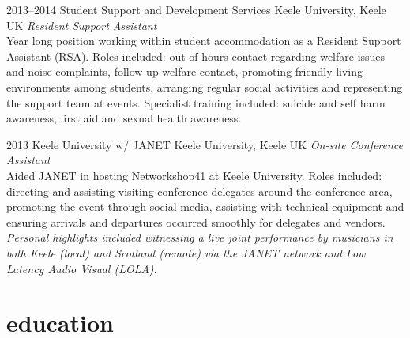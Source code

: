 \documentclass[]{friggeri-cv} %
\begin{document}
\begin{entrylist}

\entry
{2013--2014}
{Student Support and Development Services}
{Keele University, Keele UK}
{\emph{Resident Support Assistant} \\
Year long position working within student accommodation as a Resident
Support Assistant (RSA). Roles included: out of hours contact regarding
welfare issues and noise complaints, follow up welfare contact, promoting
friendly living environments among students, arranging regular social activities
and representing the support team at events. Specialist training included:
suicide and self harm awareness, first aid and sexual health awareness.}


\entry
{2013}
{Keele University w/ JANET}
{Keele University, Keele UK}
{\emph{On-site Conference Assistant} \\
Aided JANET in hosting Networkshop41 at Keele University. Roles included:
directing and assisting visiting conference delegates around the conference
area, promoting the event through social media, assisting with technical
equipment and ensuring arrivals and departures occurred smoothly for delegates
and vendors.}
{\emph{Personal highlights included witnessing a live joint performance by musicians
in both Keele (local) and Scotland (remote) via the JANET network and Low
Latency Audio Visual (LOLA).}}


\end{entrylist}


\section{education}
\end{document}
